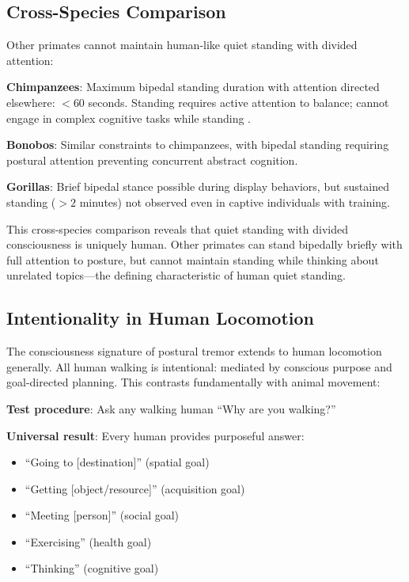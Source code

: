 \documentclass[12pt,a4paper]{article}
\begin{document}
\subsection{Cross-Species Comparison}

Other primates cannot maintain human-like quiet standing with divided attention:

\textbf{Chimpanzees}: Maximum bipedal standing duration with attention directed elsewhere: $<60$ seconds. Standing requires active attention to balance; cannot engage in complex cognitive tasks while standing \citep{sockol2007chimpanzee}.

\textbf{Bonobos}: Similar constraints to chimpanzees, with bipedal standing requiring postural attention preventing concurrent abstract cognition.

\textbf{Gorillas}: Brief bipedal stance possible during display behaviors, but sustained standing ($>2$ minutes) not observed even in captive individuals with training.

This cross-species comparison reveals that quiet standing with divided consciousness is uniquely human. Other primates can stand bipedally briefly with full attention to posture, but cannot maintain standing while thinking about unrelated topics—the defining characteristic of human quiet standing.

\subsection{Intentionality in Human Locomotion}

The consciousness signature of postural tremor extends to human locomotion generally. All human walking is intentional: mediated by conscious purpose and goal-directed planning. This contrasts fundamentally with animal movement:

\textbf{Test procedure}: Ask any walking human ``Why are you walking?''

\textbf{Universal result}: Every human provides purposeful answer:
\begin{itemize}
\item ``Going to [destination]'' (spatial goal)
\item ``Getting [object/resource]'' (acquisition goal)
\item ``Meeting [person]'' (social goal)
\item ``Exercising'' (health goal)
\item ``Thinking'' (cognitive goal)
\end{itemize}
\end{document}
